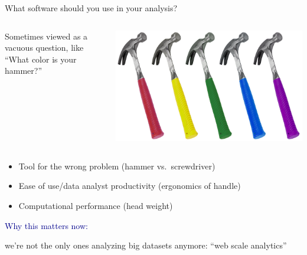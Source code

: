 \documentclass[aspectratio=169]{beamer}
\begin{document}
\begin{frame}{What software should you use in your analysis?}
\large
\vspace{0.75 cm}
\begin{columns}
Sometimes viewed as a vacuous question, like ``What color is your hammer?''

\vspace{0.75 cm}
\includegraphics[width=\linewidth]{hammer.jpg}
\end{columns}

\vspace{0.75 cm}

\large
\vspace{0.1 cm}
\begin{itemize}\setlength{\itemsep}{0.2 cm}
\item<4-> Tool for the wrong problem \hfill (hammer vs.\ screwdriver)
\item<5-> Ease of use/data analyst productivity \hfill (ergonomics of handle)
\item<6-> Computational performance \hfill (head weight)
\end{itemize}
\end{frame}

\begin{frame}{}
\vspace{1 cm}
\begin{center}
\huge \textcolor{darkblue}{Why this matters now:}

\vspace{0.5 cm}
\large we're not the only ones analyzing big datasets anymore: ``web scale analytics''
\end{center}
\end{frame}
\end{document}
